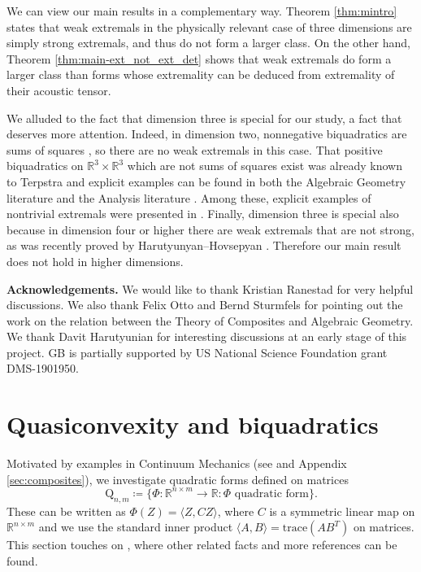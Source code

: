 \documentclass[a4paper]{article}
\numberwithin{equation}{section}
\newcommand{\R}{\mathbb{R}}
\theoremstyle{definition}
\theoremstyle{remark}
\newcommand{\qnm}{\mathrm{Q}_{n,m}}
\begin{document}
We can view our main results in a complementary way. Theorem \ref{thm:mintro} states that weak extremals in the physically relevant case of three dimensions are simply strong extremals, and thus do not form a larger class. On the other hand, Theorem \ref{thm:main-ext_not_ext_det} shows that weak extremals do form a larger class than forms whose extremality can be deduced from extremality of their acoustic tensor. 

We alluded to the fact that dimension three is special for our study, a fact that deserves more attention. Indeed, in dimension two, nonnegative biquadratics are sums of squares \cite{calderon,terpstra}, so there are no weak extremals in this case. That positive biquadratics on $\R^3\times \R^3$ which are not sums of squares exist was already known to Terpstra \cite{terpstra} and explicit examples can be found in both the Algebraic Geometry literature \cite{BS2020,Choi,choilamzbMATH03540962} and the Analysis literature \cite{HMcalcvar,serre1,serre2}. Among these, explicit examples of nontrivial extremals were presented in \cite{BS2020,choilamzbMATH03540962,HMcalcvar}. 
Finally, dimension three is special also because in dimension four or higher there are weak extremals that are not strong, as was recently proved by Harutyunyan--Hovsepyan \cite[Rk. 2.6]{harutyunyan2021extreme}. Therefore our main result does not hold in higher dimensions.

\medskip
\textbf{Acknowledgements.} We would like to thank Kristian Ranestad for very helpful discussions. We also thank Felix Otto and Bernd Sturmfels for pointing out the work on the relation between the Theory of Composites and Algebraic Geometry. We thank Davit Harutyunian for interesting discussions at an early stage of this project. GB is partially supported by US National Science Foundation grant  DMS-1901950. 

\section{Quasiconvexity and biquadratics}\label{sec:prel}

Motivated by examples in Continuum Mechanics (see \cite{GrabovskyBook,MiltonBook} and Appendix \ref{sec:composites}), we investigate quadratic forms defined on matrices
$$
\qnm\coloneqq \{\Phi\colon\R^{n\times m}\rightarrow{\R}\colon \Phi\text{ quadratic form}\}.
$$
These can be written as $\Phi(Z)=\langle Z, CZ\rangle$, where $C$ is a symmetric linear map on $\R^{n\times m}$ and we use the standard inner product $\langle A,B \rangle = \mathrm{trace}(AB^T)$ on matrices. This section touches on \cite[Sec. 5.3.2]{Dacorogna}, where other related facts and more references can be found. 
\end{document}
